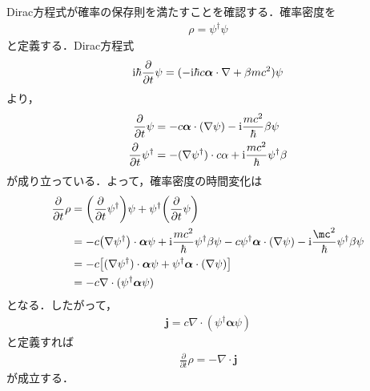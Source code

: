 \documentclass{report}
\begin{document}
Dirac方程式が確率の保存則を満たすことを確認する．確率密度を
\begin{align}
  \rho=\psi^{\dagger}\psi
\end{align}
と定義する．Dirac方程式
\begin{align}
  \mathrm{i}\hbar\frac{\partial}{\partial t} \psi = (-\mathrm{i}\hbar c\bm{\alpha}\cdot \nabla + \beta mc^2)\psi
\end{align}
より，
\begin{align}
  \frac{\partial}{\partial t}\psi &= -c \bm{\alpha} \cdot (\nabla\psi) -\mathrm{i} \frac{mc^2}\hbar \beta\psi\\
  \frac{\partial}{\partial t}\psi^{\dagger} &= -(\nabla\psi^{\dagger})\cdot c\alpha + \mathrm{i}\frac{mc^2}{\hbar}\psi^{\dagger}\beta
\end{align}
が成り立っている．よって，確率密度の時間変化は
\begin{align}
  \frac{\partial}{\partial t}\rho &= \qty(\frac{\partial}{\partial t}\psi^{\dagger})\psi + \psi^{\dagger}\qty(\frac{\partial}{\partial t}\psi)\\
  &= -c\qty(\nabla\psi^{\dagger})\cdot \bm{\alpha}\psi + \i\frac{mc^2}{\hbar}\psi^{\dagger}\beta\psi - c\psi^{\dagger}\bm{\alpha}\cdot(\nabla\psi) - \i\frac{\mc^2}{\hbar}\psi^{\dagger}\beta\psi\\
  &= -c\qty[(\nabla\psi^{\dagger})\cdot \bm{\alpha}\psi + \psi^{\dagger}\bm{\alpha}\cdot(\nabla\psi)]\\
  &= -c\nabla\cdot(\psi^{\dagger}\bm{\alpha}\psi)
\end{align}
となる．したがって，
\begin{align}
  \bm{j} = c\nabla\cdot(\psi^{\dagger}\bm{\alpha}\psi)
\end{align}
と定義すれば
\begin{align}
  \frac{\partial}{\partial t}\rho = -\nabla\cdot \bm{j}
\end{align}
が成立する．
\end{document}
